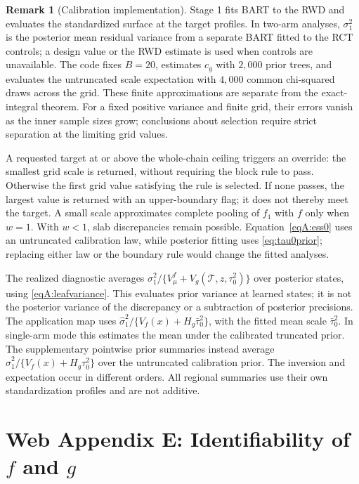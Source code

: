 \documentclass[11pt]{article}
\theoremstyle{definition}
\newtheorem{remark}[theorem]{Remark}
\theoremstyle{plain}
\begin{document}
{\begin{remark}[Calibration implementation]
Stage 1 fits BART to the RWD and evaluates the standardized surface at the target profiles. In two-arm analyses, $\sigma_1^2$ is the posterior mean residual variance from a separate BART fitted to the RCT controls; a design value or the RWD estimate is used when controls are unavailable. The code fixes $B=20$, estimates $c_g$ with $2{,}000$ prior trees, and evaluates the untruncated scale expectation with $4{,}000$ common chi-squared draws across the grid. These finite approximations are separate from the exact-integral theorem. For a fixed positive variance and finite grid, their errors vanish as the inner sample sizes grow; conclusions about selection require strict separation at the limiting grid values.

A requested target at or above the whole-chain ceiling triggers an override: the smallest grid scale is returned, without requiring the block rule to pass. Otherwise the first grid value satisfying the rule is selected. If none passes, the largest value is returned with an upper-boundary flag; it does not thereby meet the target. A small scale approximates complete pooling of $f_1$ with $f$ only when $w=1$. With $w<1$, slab discrepancies remain possible. Equation~\eqref{eqA:ess0} uses an untruncated calibration law, while posterior fitting uses \eqref{eq:tau0prior}; replacing either law or the boundary rule would change the fitted analyses.

The realized diagnostic averages $\sigma_1^2/\{V_\mu^f+V_g(\mathcal T,z,\tau_0^2)\}$ over posterior states, using \eqref{eqA:leafvariance}. This evaluates prior variance at learned states; it is not the posterior variance of the discrepancy or a subtraction of posterior precisions. The application map uses $\hat\sigma_1^2/\{V_f(x)+H_g\bar\tau_0^2\}$, with the fitted mean scale $\bar\tau_0^2$. In single-arm mode this estimates the mean under the calibrated truncated prior. The supplementary pointwise prior summaries instead average $\hat\sigma_1^2/\{V_f(x)+H_g\tau_0^2\}$ over the untruncated calibration prior. The inversion and expectation occur in different orders. All regional summaries use their own standardization profiles and are not additive.
\end{remark}

\section*{Web Appendix E: Identifiability of $f$ and $g$}

}
\end{document}
